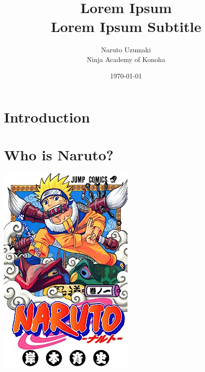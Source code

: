 \documentclass[11pt]{article}
\title{Lorem Ipsum\\\tiny Lorem Ipsum Subtitle}
\author{Naruto Uzumaki\\\tiny Ninja Academy of Konoha}
\date{\today}
\begin{document}
	\maketitle

	\section{Introduction}
		\blindtext

		\blindtext
	
	\section{Who is Naruto?}

		\includegraphics{images/NarutoCoverTankobon1.jpg}
		
\end{document}
